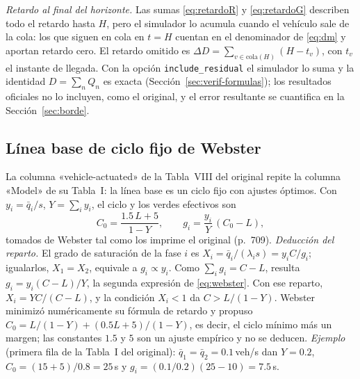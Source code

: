 \documentclass[journal]{IEEEtran}
\newcommand{\qbar}{\bar{q}}   %
\begin{document}
\emph{Retardo al final del horizonte.} Las sumas \eqref{eq:retardoR} y \eqref{eq:retardoG} describen todo el retardo hasta $H$, pero el simulador lo acumula cuando el vehículo sale de la cola: los que siguen en cola en $t=H$ cuentan en el denominador de \eqref{eq:dm} y aportan retardo cero. El retardo omitido es $\Delta D=\sum_{v\in\text{cola}(H)}(H-t_v)$, con $t_v$ el instante de llegada. Con la opción \texttt{include\_residual} el simulador lo suma y la identidad $D=\sum_n Q_n$ es exacta (Sección~\ref{sec:verif-formulas}); los resultados oficiales no lo incluyen, como el original, y el error resultante se cuantifica en la Sección~\ref{sec:borde}.

\subsection{Línea base de ciclo fijo de Webster}
\label{ap:webster}
La columna «vehicle-actuated» de la Tabla~VIII del original repite la columna «Model» de su Tabla~I: la línea base es un ciclo fijo con ajustes óptimos. Con $y_i=\qbar_i/s$, $Y=\sum_i y_i$, el ciclo y los verdes efectivos son
\begin{equation}
C_0=\frac{1.5\,L+5}{1-Y},\qquad g_i=\frac{y_i}{Y}\,(C_0-L),
\label{eq:webster}
\end{equation}
tomados de Webster \cite{Webster1958} tal como los imprime el original (p.~709). \emph{Deducción del reparto.} El grado de saturación de la fase $i$ es $X_i=\qbar_i/(\lambda_i s)=y_iC/g_i$; igualarlos, $X_1=X_2$, equivale a $g_i\propto y_i$. Como $\sum_i g_i=C-L$, resulta $g_i=y_i(C-L)/Y$, la segunda expresión de \eqref{eq:webster}. Con ese reparto, $X_i=YC/(C-L)$, y la condición $X_i<1$ da $C>L/(1-Y)$. Webster minimizó numéricamente su fórmula de retardo y propuso $C_0=L/(1-Y)+(0.5L+5)/(1-Y)$, es decir, el ciclo mínimo más un margen; las constantes $1.5$ y $5$ son un ajuste empírico y no se deducen. \emph{Ejemplo} (primera fila de la Tabla~I del original): $\qbar_1=\qbar_2=0.1$\,veh/s dan $Y=0.2$, $C_0=(15+5)/0.8=25$\,s y $g_i=(0.1/0.2)(25-10)=7.5$\,s.
\end{document}
